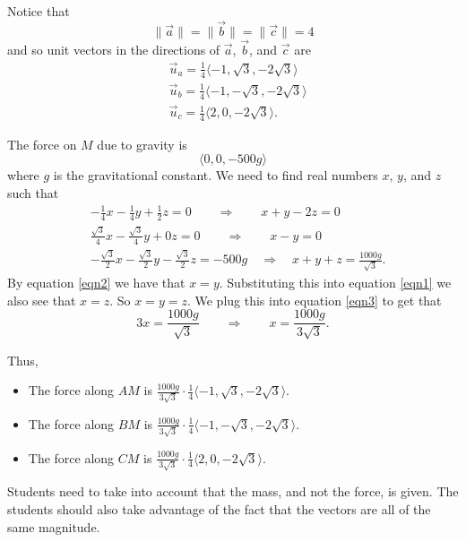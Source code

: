 \documentclass[]{ximera}
\begin{document}
\begin{problem}
\begin{freeResponse}
	Notice that
		\[
		\| \vec{a} \| = \| \vec{b} \| = \| \vec{c} \| = 4
		\]
	and so unit vectors in the directions of $\vec{a}$, $\vec{b}$, and $\vec{c}$ are
		\begin{align*}
		&\vec{u}_a = \frac{1}{4} \langle -1, \sqrt{3}, -2\sqrt{3} \rangle  \\
		&\vec{u}_b = \frac{1}{4} \langle -1, - \sqrt{3}, -2\sqrt{3} \rangle  \\
		&\vec{u}_c = \frac{1}{4} \langle 2, 0, -2\sqrt{3} \rangle  .
		\end{align*}
		
	The force on $M$ due to gravity is 
		\[
		\langle 0,0, -500 g \rangle
		\]
	where $g$ is the gravitational constant.  
	We need to find real numbers $x$, $y$, and $z$ such that
		\begin{align}
		&-\frac{1}{4} x - \frac{1}{4} y + \frac{1}{2} z = 0    \qquad \Longrightarrow \qquad x+y-2z=0  \label{eqn1}  \\
		&\frac{\sqrt{3}}{4} x - \frac{\sqrt{3}}{4} y + 0z = 0  \qquad \Longrightarrow \qquad x-y=0  \label{eqn2}  \\
		&- \frac{\sqrt{3}}{2} x - \frac{\sqrt{3}}{2} y - \frac{\sqrt{3}}{2} z = -500g  \quad \Longrightarrow \quad x+y+z= \frac{1000g}{\sqrt{3}}. \label{eqn3}
		\end{align}
	By equation \eqref{eqn2} we have that $x=y$.  
	Substituting this into equation \eqref{eqn1} we also see that $x=z$.  
	So $x=y=z$.  
	We plug this into equation \eqref{eqn3} to get that
		\[
		3x = \frac{1000g}{\sqrt{3}} \qquad \Longrightarrow \qquad x = \frac{1000g}{3\sqrt{3}}.
		\]
		
	Thus,
		\begin{itemize}
		\item  The force along $AM$ is $\boxed{\frac{1000g}{3\sqrt{3}} \cdot \frac{1}{4} \langle -1, \sqrt{3},-2\sqrt{3} \rangle}$.
		\item  The force along $BM$ is $\boxed{\frac{1000g}{3\sqrt{3}} \cdot \frac{1}{4} \langle -1, -\sqrt{3}, -2\sqrt{3} \rangle}$.
		\item  The force along $CM$ is $\boxed{\frac{1000g}{3\sqrt{3}} \cdot \frac{1}{4} \langle 2,0,-2\sqrt{3} \rangle }$.
		\end{itemize}
	\end{freeResponse}
		
\end{problem}

\begin{instructorNotes}
Students need to take into account that the mass, and not the force, is given.  
The students should also take advantage of the fact that the vectors are all of the same magnitude.  
\end{instructorNotes}
\end{document}
